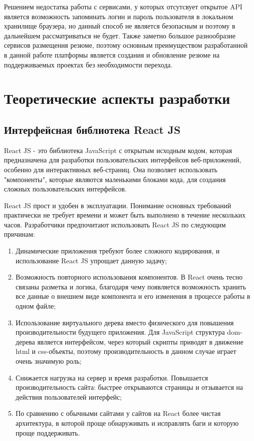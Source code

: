 \documentclass[master, och, diploma]{SCWorks}
\begin{document}
Решением недостатка работы с сервисами, у которых отсутсвует открытое API является возможность запоминать логин и пароль пользователя в локальном хранилище браузера, но данный способ не является безопасным и поэтому в дальнейшем рассматриваться не будет. Также заметно большое разнообразие сервисов размещения резюме, поэтому основным преимуществом разработанной в данной работе платформы является создания и обновление резюме на поддерживаемых проектах без необходимости перехода.  



\newpage
\section{Теоретические аспекты разработки}
\subsection{Интерфейсная библиотека React JS}
React JS - это библиотека JavaScript с открытым исходным кодом, которая предназначена для разработки пользовательских интерфейсов веб-приложений, особенно для интерактивных веб-страниц. Она позволяет использовать "компоненты", которые являются маленькими блоками кода, для создания сложных пользовательских интерфейсов.

React JS прост и удобен в эксплуатации. Понимание основных требований практически не требует времени и может быть выполнено в течение нескольких часов. Разработчики предпочитают использовать React JS по следующим причинам:
\begin{enumerate}
    \item Динамические приложения требуют более сложного кодирования, и использование React JS упрощает данную задачу;
    \item Возможность повторного использования компонентов. В React очень тесно связаны разметка и логика, благодаря чему появляется возможность хранить все данные о внешнем виде компонента и его изменения в процессе работы в одном файле;
    \item Использование виртуального дерева вместо физического для повышения производительности будущего приложения. Для JavaScript структура dom-дерева является интерфейсом, через который скрипты приводят в движение html и css-объекты, поэтому производительность в данном случае играет очень значимую роль;
    \item Снижается нагрузка на сервер и время разработки. Повышается производительность сайта: быстрее открываются страницы и отзывается на действия пользователей интерфейс;
    \item По сравнению с обычными сайтами у сайтов на React более чистая архитектура, в которой проще обнаруживать и исправлять баги и которую проще поддерживать. \cite{rjs_vs_rn}\cite{rjs}
\end{enumerate}
\end{document}
